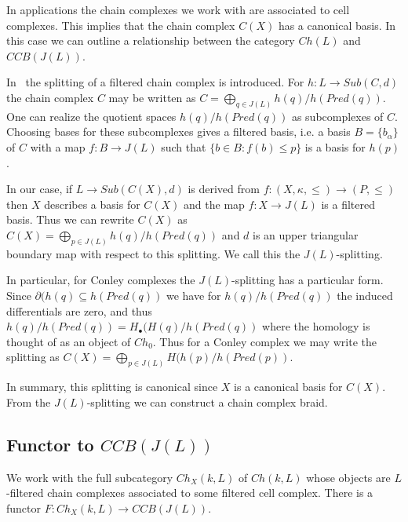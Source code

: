 In applications the chain complexes we work with are associated to cell complexes.  This implies that the chain complex $C(X)$ has a canonical basis. In this case we can outline a relationship between the category $Ch(L)$ and $CCB(J(L))$.


In~\cite[Section 7]{salamon} the splitting of a filtered chain complex is introduced.   For $h:L\to Sub(C,d)$ the chain complex $C$ may be written as $C=\bigoplus_{q\in J(L)} h(q)/h(Pred(q))$.  One can realize the quotient spaces $h(q)/h(Pred(q))$ as subcomplexes of $C$.  Choosing bases for these subcomplexes gives a filtered basis, i.e. a basis $B=\{b_\alpha\}$ of $C$ with a map $f:B\to J(L)$ such that $\{b\in B: f(b)\leq p\}$ is a basis for $h(p)$.

In our case, if $L\to Sub(C(X),d)$ is derived from $f:(X,\kappa,\leq)\to (P,\leq)$ then $X$ describes a basis for $C(X)$ and the map $f:X\to J(L)$ is a filtered basis.   Thus we can rewrite $C(X)$ as $C(X)=\bigoplus_{p\in J(L)} h(q)/h(Pred(q))$ and $d$ is an upper triangular boundary map with respect to this splitting.  We call this the $J(L)$-splitting.


In particular, for Conley complexes the $J(L)$-splitting has a particular form.  Since $\partial(h(q)\subseteq h(Pred(q))$ we have for $h(q)/h(Pred(q))$ the induced differentials are zero, and thus $h(q)/h(Pred(q)) = H_\bullet(H(q)/h(Pred(q))$ where the homology is thought of as an object of $Ch_0$.  Thus for a Conley complex we may write the splitting as $C(X) = \bigoplus_{p\in J(L)} H(h(p)/h(Pred(p))$.


In summary, this splitting is canonical since $X$ is a canonical basis for $C(X)$.  From the $J(L)$-splitting we can construct a chain complex braid.







\subsection{Functor to $CCB(J(L))$}

We work with the full subcategory $Ch_X(k,L)$ of $Ch(k,L)$ whose objects are $L$-filtered chain complexes associated to some filtered cell complex.  There is a functor $F:Ch_X(k,L)\to CCB(J(L))$.

